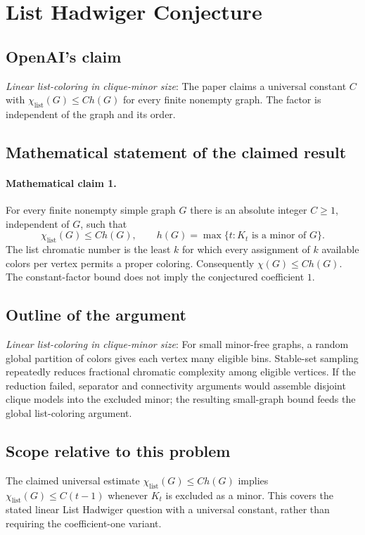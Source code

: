 \documentclass[11pt]{article}
\begin{document}
\section*{List Hadwiger Conjecture}

\subsection{OpenAI's claim}
\textit{Linear list-coloring in clique-minor size}: The paper claims a universal constant $C$ with $\chi_{\mathrm{list}}(G)\le C h(G)$ for every finite nonempty graph. The factor is independent of the graph and its order.

\subsection{Mathematical statement of the claimed result}
\paragraph{Mathematical claim 1.} For every finite nonempty simple graph $G$ there is an absolute integer $C\ge1$, independent of $G$, such that \[\chi_{\mathrm{list}}(G)\le C h(G),\qquad h(G)=\max\{t:K_t\text{ is a minor of }G\}.\] The list chromatic number is the least $k$ for which every assignment of $k$ available colors per vertex permits a proper coloring. Consequently $\chi(G)\le Ch(G)$. The constant-factor bound does not imply the conjectured coefficient $1$.

\subsection{Outline of the argument}
\textit{Linear list-coloring in clique-minor size}: For small minor-free graphs, a random global partition of colors gives each vertex many eligible bins. Stable-set sampling repeatedly reduces fractional chromatic complexity among eligible vertices. If the reduction failed, separator and connectivity arguments would assemble disjoint clique models into the excluded minor; the resulting small-graph bound feeds the global list-coloring argument.

\subsection{Scope relative to this problem}
The claimed universal estimate $\chi_{\mathrm{list}}(G)\le Ch(G)$ implies $\chi_{\mathrm{list}}(G)\le C(t-1)$ whenever $K_t$ is excluded as a minor. This covers the stated linear List Hadwiger question with a universal constant, rather than requiring the coefficient-one variant.
\end{document}

